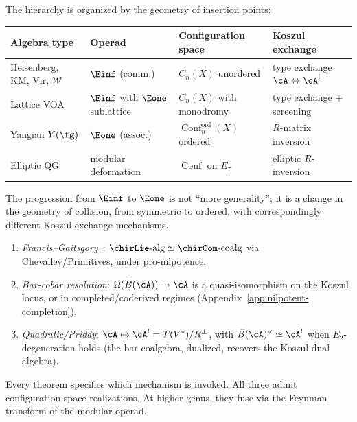 \begin{remark}
\label{rem:operadic-hierarchy-table}
The hierarchy is organized by the geometry of insertion points:
\begin{center}
\small
\begin{tabular}{llll}
\textbf{Algebra type} & \textbf{Operad} &
  \textbf{Configuration space} & \textbf{Koszul exchange} \\ \hline
Heisenberg, KM, Vir, $\mathcal{W}$
  & $\Einf$ (comm.)
  & $C_n(X)$ unordered
  & type exchange $\cA \leftrightarrow \cA^!$ \\[2pt]
Lattice VOA
  & $\Einf$ with $\Eone$ sublattice
  & $C_n(X)$ with monodromy
  & type exchange + screening \\[2pt]
Yangian $Y(\fg)$
  & $\Eone$ (assoc.)
  & $\operatorname{Conf}_n^{\mathrm{ord}}(X)$ ordered
  & $R$-matrix inversion \\[2pt]
Elliptic QG
  & modular deformation
  & $\operatorname{Conf}$ on $E_\tau$
  & elliptic $R$-inversion
\end{tabular}
\end{center}
The progression from $\Einf$ to $\Eone$ is not ``more
generality''; it is a change in the geometry of collision, from
symmetric to ordered, with correspondingly different Koszul
exchange mechanisms.
\end{remark}

\begin{remark}
\label{rem:three-koszul-mechanisms}
\begin{enumerate}[label=(\roman*)]
\item \emph{Francis--Gaitsgory}~\cite{FG12}:
  $\chirLie\text{-alg} \simeq \chirCom\text{-coalg}$ via
  Chevalley/Primitives, under pro-nilpotence.
\item \emph{Bar-cobar resolution}: $\Omega(\bar{B}(\cA)) \to \cA$
  is a quasi-isomorphism on the Koszul locus, or in
  completed/coderived regimes
  (Appendix~\ref{app:nilpotent-completion}).
\item \emph{Quadratic/Priddy}:
  $\cA \mapsto \cA^! = T(V^*)/R^\perp$, with
  $\bar{B}(\cA)^\vee \simeq \cA^!$ when $E_2$-degeneration holds (the bar coalgebra, dualized, recovers the Koszul dual algebra).
\end{enumerate}
Every theorem specifies which mechanism is invoked.  All three
admit configuration space realizations.  At higher genus, they fuse
via the Feynman transform of the modular operad.
\end{remark}

